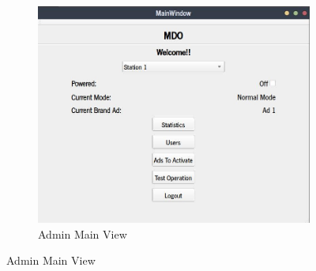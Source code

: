 \begin{figure}[htb!]
  \centering
  \begin{subfigure}{.4\textwidth}
  \includegraphics[width=\textwidth]{img/admin-main-view.jpg}%
  \caption{Admin Main View}%
  \label{fig:admin-main-view}
\end{subfigure}


\end{figure}
